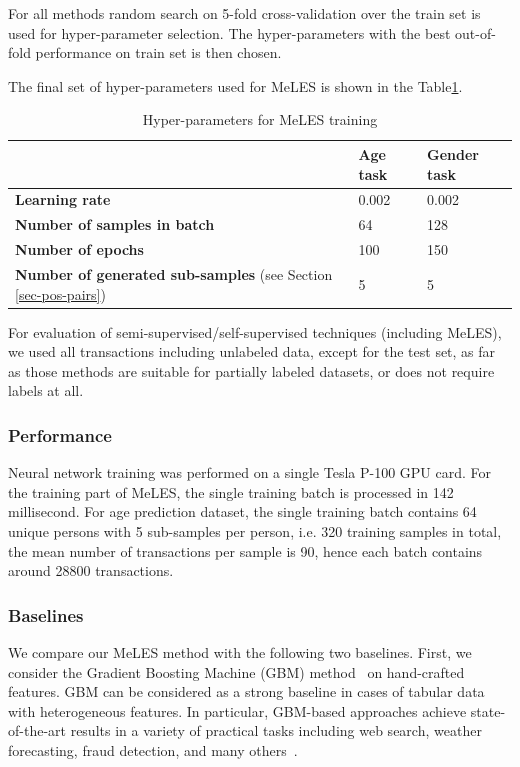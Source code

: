 \documentclass[sigconf, anonymous]{acmart}
\begin{document}
For all methods random search on 5-fold cross-validation over the train set is used for hyper-parameter selection. The hyper-parameters with the best out-of-fold performance on train set is then chosen.

The final set of hyper-parameters used for MeLES is shown in the Table\ref{tab-hyper}.

\begin{table}[h]
\caption{Hyper-parameters for MeLES training}
\begin{tabular}{ | m{18em} |  m{3em} | m{3em} | }
\hline
& \textbf{Age task} & \textbf{Gender task} \\
\hline
\textbf{Learning rate} & 0.002 & 0.002 \\
\textbf{Number of samples in batch} & 64 & 128 \\
\textbf{Number of epochs} & 100 & 150 \\
\textbf{Number of generated sub-samples} (see Section \ref{sec-pos-pairs}) & 5 & 5 \\
\hline
\end{tabular}
\label{tab-hyper}
\end{table}

For evaluation of semi-supervised/self-supervised techniques (including MeLES), we used all transactions including unlabeled data, except for the test set, as far as those methods are suitable for partially labeled datasets, or does not require labels at all.

\subsubsection{Performance}

Neural network training was performed on a single Tesla P-100 GPU card. For the training part of MeLES, the single training batch is processed in 142 millisecond. For age prediction dataset, the single training batch contains 64 unique persons with 5 sub-samples per person, i.e. 320 training samples in total, the mean number of transactions per sample is 90, hence each batch contains around 28800 transactions.

\subsubsection{Baselines} \label{sec-baselines}

We compare our MeLES method with the following two baselines. First, we consider the Gradient Boosting Machine (GBM) method~\cite{friedman2001} on hand-crafted features. GBM can be considered as a strong baseline in cases of tabular data with heterogeneous features. In particular, GBM-based approaches achieve state-of-the-art results in a variety of practical tasks including web search, weather forecasting, fraud detection, and many others~\cite{wu2010adapting, Vorobev2019filter, zhang2015gradient, niu2019comparison}.
\end{document}
